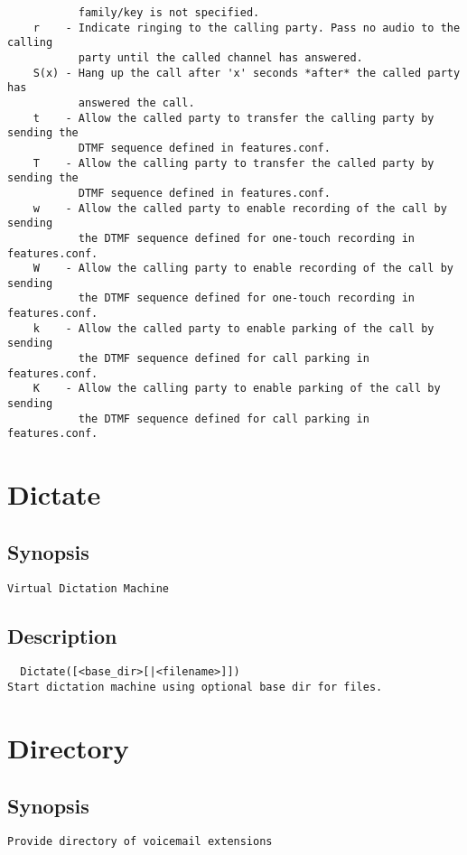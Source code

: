 \begin{verbatim}
           family/key is not specified.
    r    - Indicate ringing to the calling party. Pass no audio to the calling
           party until the called channel has answered.
    S(x) - Hang up the call after 'x' seconds *after* the called party has
           answered the call.
    t    - Allow the called party to transfer the calling party by sending the
           DTMF sequence defined in features.conf.
    T    - Allow the calling party to transfer the called party by sending the
           DTMF sequence defined in features.conf.
    w    - Allow the called party to enable recording of the call by sending
           the DTMF sequence defined for one-touch recording in features.conf.
    W    - Allow the calling party to enable recording of the call by sending
           the DTMF sequence defined for one-touch recording in features.conf.
    k    - Allow the called party to enable parking of the call by sending
           the DTMF sequence defined for call parking in features.conf.
    K    - Allow the calling party to enable parking of the call by sending
           the DTMF sequence defined for call parking in features.conf.

\end{verbatim}


\section{Dictate}
\subsection{Synopsis}
\begin{verbatim}
Virtual Dictation Machine
\end{verbatim}
\subsection{Description}
\begin{verbatim}
  Dictate([<base_dir>[|<filename>]])
Start dictation machine using optional base dir for files.

\end{verbatim}


\section{Directory}
\subsection{Synopsis}
\begin{verbatim}
Provide directory of voicemail extensions
\end{verbatim}
